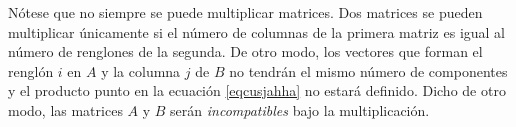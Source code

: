 \newpage

Nótese que no siempre se puede multiplicar matrices. Dos matrices se pueden multiplicar únicamente si el número de columnas de la primera matriz es igual al número de renglones de la segunda. De otro modo, los vectores que forman el renglón $i$ en $A$ y la columna $j$ de $B$ no tendrán el mismo número de componentes y el producto punto en la ecuación \eqref{eqcusjahha} no estará definido. Dicho de otro modo, las matrices $A$ y $B$ serán \textit{incompatibles} bajo la multiplicación.
